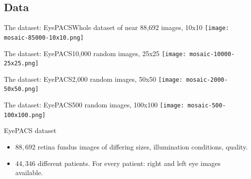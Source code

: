 \documentclass{beamer}
\begin{document}
\subsection{Data}

\begin{frame}{The dataset: EyePACS}{Whole dataset of near 88,692 images, 10x10}
\texttt{[image: mosaic-85000-10x10.png]}	
\end{frame}

\begin{frame}{The dataset: EyePACS}{10,000 random images, 25x25}
\texttt{[image: mosaic-10000-25x25.png]}	
\end{frame}

\begin{frame}{The dataset: EyePACS}{2,000 random images, 50x50}
\texttt{[image: mosaic-2000-50x50.png]}	
\end{frame}

\begin{frame}{The dataset: EyePACS}{500 random images, 100x100}
\texttt{[image: mosaic-500-100x100.png]}	
\end{frame}


\begin{frame}{EyePACS dataset}{}
\begin{figure}[p]
\end{figure}
\begin{itemize}
\item $88,692$ retina fundus images of differing sizes, illumination conditions, quality.\\ 
\item  $44,346$ different patients. For every patient: right and left eye images available.
\end{itemize}
\end{frame}
\end{document}
